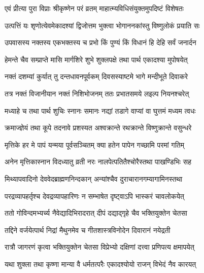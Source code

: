 \label{sec:vrata-raja-margashirsha-krishna}


\twolineshloka
{एवं प्रीत्या पुरा विप्राः श्रीकृष्णेन परं व्रतम्}
{माहात्म्यविधिसंयुक्तमुपदिष्टं विशेषतः} %

\twolineshloka
{उत्पत्तिं यः शृणोत्येवमेकादश्यां द्विजोत्तम}
{भुक्त्वा भोगाननकांस्तु विष्णुलोकं प्रयाति सः} %


\twolineshloka
{उपवासस्य नक्तस्य एकभक्तस्य च प्रभो}
{किं पुण्यं किं विधानं हि देहि सर्वं जनार्दन} %


\twolineshloka
{हेमन्ते चैव सम्प्राप्ते मासि मार्गशिरे शुभे}
{शुक्लपक्षे तथा पार्थ एकादश्या मुपोषयेत्} %

\twolineshloka
{नक्तं दशम्यां कुर्यात् तु दन्तधावनपूर्वकम्}
{दिवसस्याष्टमे भागे मन्दीभूते दिवाकरे} %

\twolineshloka
{तत्र नक्तं विजानीयान नक्तं निशिभोजनम्}
{ततः प्रभातसमये लइल्प नियनश्चरेत्} %

\twolineshloka
{मध्याहे च तथा पार्थ शुचिः स्नानः समानः}
{नद्यां तडागे वाप्यां वा घुत्तमं मध्यम त्वधः} %

\twolineshloka
{क्रमाज्ज्ञेयं तथा कूपे तदनावे प्रशस्यत}
{अश्वक्रान्ते रथक्रान्ते विष्णुक्रान्ते वसुन्धरे} %

\twolineshloka
{मृत्तिके हर मे पापं यन्मया पूर्वसञ्चितम्}
{क्या हतेन पापेन गच्छामि परमां गतिम्} %

\twolineshloka
{अनेन मृत्तिकास्नान विदध्यातु व्रती नरः}
{नालपेत्पतितैश्चोरैस्तथा पाखण्डिभिः सह} %

\twolineshloka
{मिथ्यापवादिनो देववेदब्राह्मणनिन्दकान्}
{अन्यांश्चैव दुराचारानगम्यागामिनस्तथा} %

\twolineshloka
{परद्रव्यापहर्तृश्च देवद्रव्यापहारिणः}
{न सम्भाषेत दृष्ट्वाऽपि भास्करं चावलोकयेत्} %

\twolineshloka
{ततो गोविन्दमभ्यर्च्य नैवेद्यादिभिरादरात्}
{दीपं दद्याद्गृहे चैव भक्तियुक्तेन चेतसा} %

\twolineshloka
{तद्दिने वर्जयेत्पार्थ निद्रां मैथुनमेव च}
{गीतशास्त्रविनोदेन दिवारानं नयेद्रती} %

\twolineshloka
{रात्रौ जागरणं कृत्वा भक्तियुक्तेन चेतसा}
{विप्रेभ्यो दक्षिणां दत्त्वा प्रणिपत्य क्षमापयेत्} %

\twolineshloka
{यथा शुक्ला तथा कृष्णा मान्या वै धर्मतत्परैः}
{एकादश्योयो राजन् विभेदं नैव कारयत्} %

